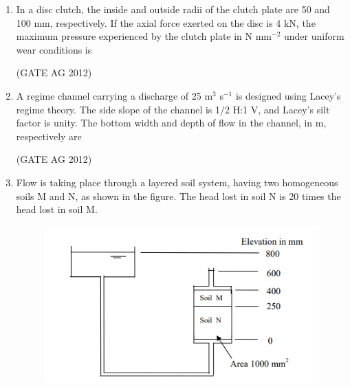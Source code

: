 \documentclass[journal]{IEEEtran}
\begin{document}
\begin{enumerate}
\medskip

\item
 In a disc clutch, the inside and outside radii of the clutch plate are 50 and 100 mm, respectively. If the axial force exerted on the disc is 4 kN, the maximum pressure experienced by the clutch plate in N mm$^{-2}$ under uniform wear conditions is
\begin{enumerate}
\end{enumerate}
\hfill(GATE AG 2012)\\

\medskip

\item
 A regime channel carrying a discharge of 25 m$^3$ s$^{-1}$ is designed using Lacey's regime theory. The side slope of the channel is 1/2 H:1 V, and Lacey’s silt factor is unity. The bottom width and depth of flow in the channel, in m, respectively are
\begin{enumerate}
\end{enumerate}
\hfill(GATE AG 2012)\\

\medskip

\item
 Flow is taking place through a layered soil system, having two homogeneous soils M and N, as shown in the figure. The head lost in soil N is 20 times the head lost in soil M.

\begin{figure}[h]
    \centering
    \includegraphics[width=0.7\columnwidth]{Figs/Screenshot 2025-08-18 093210.png}
    \caption{}
    \label{fig 1}
\end{figure}


\end{enumerate}
\end{document}
